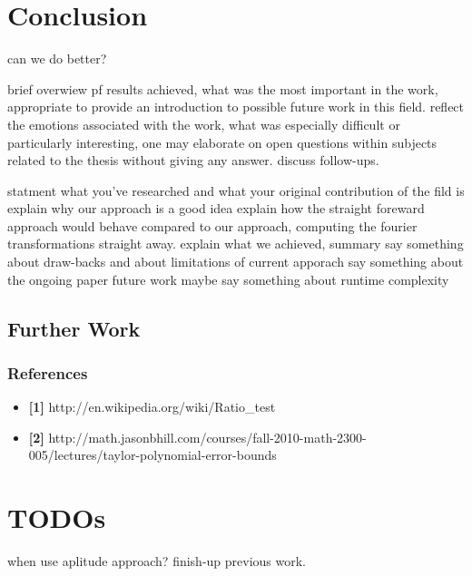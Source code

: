 \section{Conclusion}

can we do better?

brief overwiew pf results achieved, what was the most important in the work, appropriate to provide an introduction to possible future work in this field. reflect the emotions associated with the work, what was especially difficult or particularly interesting, one may elaborate on open questions within subjects related to the thesis without giving any answer. discuss follow-ups.

statment what you've researched and what your original contribution of the fild is
explain why our approach is a good idea
explain how the straight foreward approach would behave compared to our approach, computing the fourier transformations straight away.
explain what we achieved, summary
say something about draw-backs and about limitations of current apporach
say something about the ongoing paper future work
maybe say something about runtime complexity

\subsection{Further Work}
\subsubsection{References}
\begin{itemize}
\item \textbf{{[}1{]}} http://en.wikipedia.org/wiki/Ratio\_test
\item \textbf{{[}2{]}} http://math.jasonbhill.com/courses/fall-2010-math-2300-005/lectures/taylor-polynomial-error-bounds\end{itemize}

\section{TODOs}

when use aplitude approach?
finish-up previous work.

